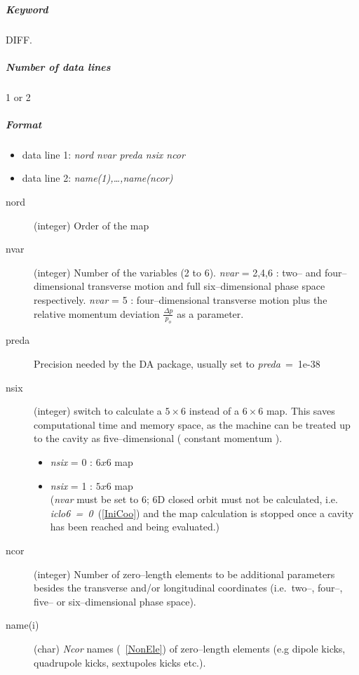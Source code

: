 \subparagraph{Keyword} DIFF.  \subparagraph{Number of data lines} 1 or
2

\subparagraph{Format}
\begin{itemize}
\item data line 1: {\em nord nvar preda nsix ncor}
\item data line 2: {\em name(1),\ldots,name(ncor)}
\end{itemize}

\begin{description}
\item [nord] (integer) Order of the map
\item [nvar] (integer) Number of the variables (2 to 6).  {\em nvar}
  \/= 2,4,6 : two-- and four--dimensional transverse motion and full
  six--dimensional phase space respectively.  {\em nvar} \/= 5 :
  four--dimensional transverse motion plus the relative momentum
  deviation \mbox{$ \frac{\Delta p}{p_o} $} as a parameter.
\item [preda] Precision needed by the DA package, usually set to
  \mbox{{\em preda} \/= 1e-38}
\item [nsix] (integer) switch to calculate a $ 5 \times 6 $ instead of a $
  6 \times 6 $ map. This saves computational time and memory space, as the
  machine can be treated up to the cavity as five--dimensional (
  constant momentum ).

 \begin{itemize}
 \item {\em nsix} \/= 0 : $ 6x6 $ map
 \item {\em nsix} \/= 1 : $ 5x6 $ map \\
   ({\em nvar} \/must be set to 6; 6D closed orbit must not be
   calculated, i.e. \mbox{\em iclo6 = 0}~(\ref{IniCoo}) and the map
   calculation is stopped once a cavity has been reached and being
   evaluated.)
 \end{itemize}
\item [ncor] (integer) Number of zero--length elements to be
  additional parameters besides the transverse and/or longitudinal
  coordinates (i.e.\ two--, four--, five-- or six--dimensional phase
  space).
\item [name(i)] (char) {\em Ncor} \/names (~\ref{NonEle}) of
  zero--length elements (e.g dipole kicks, quadrupole kicks,
  sextupoles kicks etc.).
\end{description}

